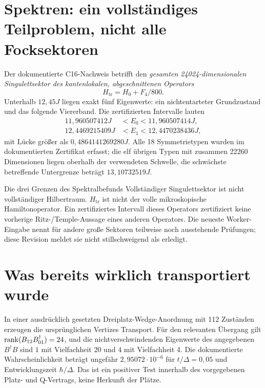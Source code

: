 \section{Spektren: ein vollständiges Teilproblem, nicht alle Focksektoren}
Der dokumentierte C16-Nachweis betrifft den \emph{gesamten 24024-dimensionalen Singulettsektor des kantenlokalen, abgeschnittenen Operators}
\begin{equation}
H_{\mathrm{tr}}=H_0+F_4/800.
\end{equation}
Unterhalb $12{,}45J$ liegen exakt fünf Eigenwerte: ein nichtentarteter Grundzustand und das folgende Viererband. Die zertifizierten Intervalle lauten
\begin{align}
11{,}960507412J&<E_0<11{,}960507414J,\\
12{,}4469215409J&<E_1<12{,}4470238436J,
\end{align}
mit Lücke größer als $0{,}4864141269280J$. Alle 18 Symmetrietypen wurden im dokumentierten Zertifikat erfasst; die elf übrigen Typen mit zusammen 22260 Dimensionen liegen oberhalb der verwendeten Schwelle, die schwächste betreffende Untergrenze beträgt $13{,}10732519J$.

\begin{grenze}{Die drei Grenzen des Spektralbefunds}
Vollständiger Singulettsektor ist nicht vollständiger Hilbertraum. $H_{\mathrm{tr}}$ ist nicht der volle mikroskopische Hamiltonoperator. Ein zertifiziertes Intervall dieses Operators zertifiziert keine vorherige Ritz-/Temple-Aussage eines anderen Operators. Die neueste Worker-Eingabe nennt für andere große Sektoren teilweise noch ausstehende Prüfungen; diese Revision meldet sie nicht stillschweigend als erledigt.
\end{grenze}

\section{Was bereits wirklich transportiert wurde}
In einer ausdrücklich gesetzten Dreiplatz-Wedge-Anordnung mit 112 Zuständen erzeugen die ursprünglichen Vertizes Transport. Für den relevanten Übergang gilt $\operatorname{rank}(B_{12}B_{01}^\dagger)=24$, und die nichtverschwindenden Eigenwerte des angegebenen $B^\dagger B$ sind $1$ mit Vielfachheit 20 und $4$ mit Vielfachheit 4. Die dokumentierte Wahrscheinlichkeit beträgt ungefähr $2{,}95072\cdot10^{-6}$ für $t/\Delta=0{,}05$ und Entwicklungszeit $\hbar/\Delta$. Das ist ein positiver Test innerhalb des vorgegebenen Platz- und Q-Vertrags, keine Herkunft der Plätze.

